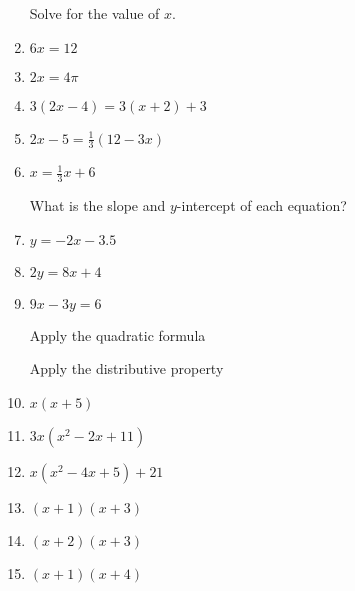 \documentclass[12pt, oneside]{article}
\begin{document}
\begin{enumerate}
  \newpage
Solve for the value of $x$.
  \item   $6x=12$ \vspace{2cm}
  \item   $2x=4\pi$ \vspace{2cm}

  \item   $3(2x-4)=3(x+2)+3$ \vspace{4.5cm}
  \item   $2x-5=\frac{1}{3}(12-3x)$ \vspace{4.5cm}
  \item   $x=\frac{1}{3}x+6$ \vspace{3cm}

  \newpage
What is the slope and $y$-intercept of each equation?
  \item   $y=-2x-3.5$ \vspace{2cm}
  \item   $2y=8x+4$ \vspace{2cm}
  \item   $9x-3y=6$ \vspace{3cm}

\newpage
Apply the quadratic formula


\newpage
Apply the distributive property
  \item $x(x+5)$ \vspace{2cm}
  \item $3x(x^2-2x+11)$ \vspace{2.5cm}
  \item $x(x^2-4x+5)+21$  \vspace{2.5cm}
  \item $(x+1)(x+3)$ \vspace{3cm}
  \item $(x+2)(x+3)$ \vspace{3cm}
  \item $(x+1)(x+4)$ \vspace{3cm}


\end{enumerate}
\end{document}
